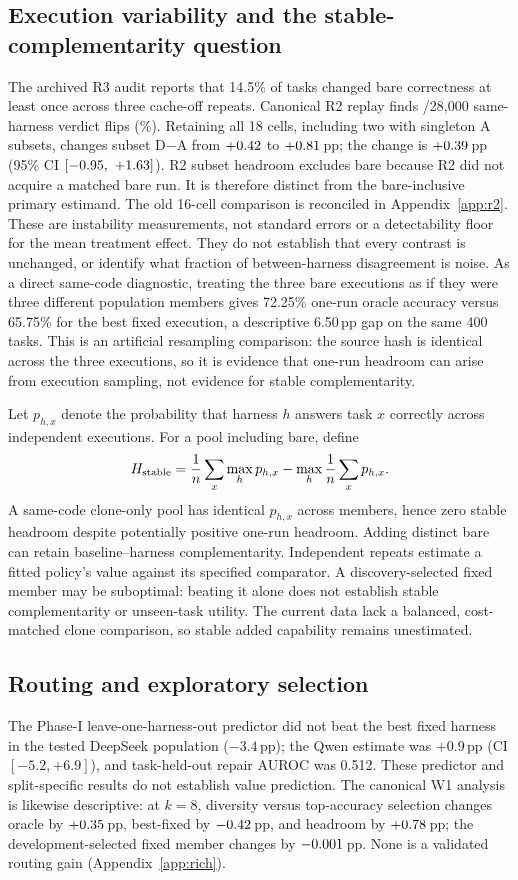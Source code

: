 \subsection{Execution variability and the stable-complementarity question}
The archived R3 audit reports that 14.5\% of tasks changed bare correctness
at least once across three cache-off repeats. Canonical R2 replay finds
\RevisionRtwoFlips/28{,}000 same-harness verdict flips
(\RevisionRtwoFlipPercent\%). Retaining all 18 cells, including two with
singleton A subsets, changes subset D$-$A from
$+0.42$ to $+0.81$\,pp; the change is
$+0.39$\,pp (95\% CI $[-0.95,\ +1.63]$).
R2 subset headroom excludes bare because R2 did not acquire a matched bare
run. It is therefore distinct from the bare-inclusive primary estimand.
The old 16-cell comparison is reconciled in Appendix~\ref{app:r2}. These are
instability measurements, not standard errors or a detectability floor for
the mean treatment effect. They do not establish that every contrast is
unchanged, or identify what fraction of between-harness disagreement is noise.
As a direct same-code diagnostic, treating the three bare executions as if
they were three different population members gives 72.25\% one-run oracle
accuracy versus 65.75\% for the best fixed execution, a descriptive 6.50\,pp
gap on the same 400 tasks. This is an artificial resampling comparison: the
source hash is identical across the three executions, so it is evidence that
one-run headroom can arise from execution sampling, not evidence for stable
complementarity.

Let $p_{h,x}$ denote the probability that harness $h$ answers task $x$
correctly across independent executions. For a pool including bare, define
\[
H_{\rm stable}=\frac{1}{n}\sum_x\max_h p_{h,x}
-\max_h\frac{1}{n}\sum_x p_{h,x}.
\]
A same-code clone-only pool has identical $p_{h,x}$ across members,
hence zero stable headroom despite potentially positive one-run headroom.
Adding distinct bare can retain baseline--harness complementarity.
Independent repeats estimate a fitted policy's value against its specified
comparator. A discovery-selected fixed member may be suboptimal: beating
it alone does not establish stable complementarity or unseen-task utility.
The current data lack a balanced, cost-matched clone comparison, so stable
added capability remains unestimated.

\subsection{Routing and exploratory selection}\label{sec:boundary}
The Phase-I leave-one-harness-out predictor did not beat the best fixed
harness in the tested DeepSeek population ($-3.4$\,pp); the Qwen estimate
was $+0.9$\,pp (CI $[-5.2,+6.9]$), and task-held-out repair AUROC was
0.512. These predictor and split-specific results do not establish value
prediction. The canonical W1 analysis is likewise descriptive: at $k=8$,
diversity versus top-accuracy selection changes oracle by
$+0.35$\,pp, best-fixed by $-0.42$\,pp, and
headroom by $+0.78$\,pp; the development-selected fixed
member changes by $-0.001$\,pp. None is a validated routing
gain (Appendix~\ref{app:rich}).
